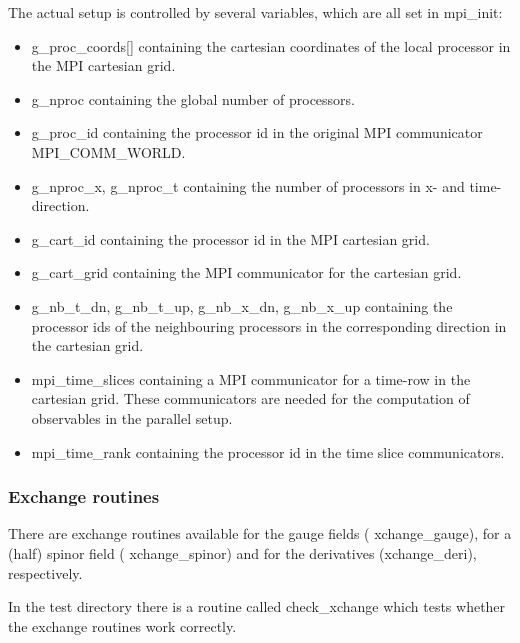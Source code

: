 The actual setup is controlled by several variables, which are all set
in {\ttfamily mpi\_init}:
\begin{itemize}
\item {\ttfamily g\_proc\_coords[]} containing the cartesian
  coordinates of the local processor in the MPI cartesian grid.
\item {\ttfamily g\_nproc} containing the global number of processors.
\item {\ttfamily g\_proc\_id} containing the processor id in the
  original MPI communicator {\ttfamily MPI\_COMM\_WORLD}.
\item {\ttfamily g\_nproc\_x, g\_nproc\_t} containing the number of
  processors in x- and time-direction.
\item {\ttfamily g\_cart\_id} containing the processor id in the MPI
  cartesian grid.
\item {\ttfamily g\_cart\_grid} containing the MPI communicator for
  the cartesian grid.
\item {\ttfamily g\_nb\_t\_dn}, {\ttfamily g\_nb\_t\_up}, {\ttfamily
    g\_nb\_x\_dn}, {\ttfamily g\_nb\_x\_up} containing the processor
  ids of the neighbouring processors in the corresponding direction in
  the cartesian grid.
\item {\ttfamily mpi\_time\_slices} containing a MPI communicator
  for a time-row in the cartesian grid. These communicators are needed
  for the computation of observables in the parallel setup.
\item {\ttfamily mpi\_time\_rank} containing the processor id in the
  time slice communicators.
\end{itemize}

\subsubsection{Exchange routines}

There are exchange routines available for the gauge fields ({\ttfamily
  xchange\_gauge}), for a (half) spinor field ({\ttfamily
  xchange\_spinor}) and for the derivatives ({\ttfamily xchange\_deri}),
respectively.

In the test directory there is a routine called {\ttfamily
  check\_xchange} which tests whether the exchange routines work correctly.


